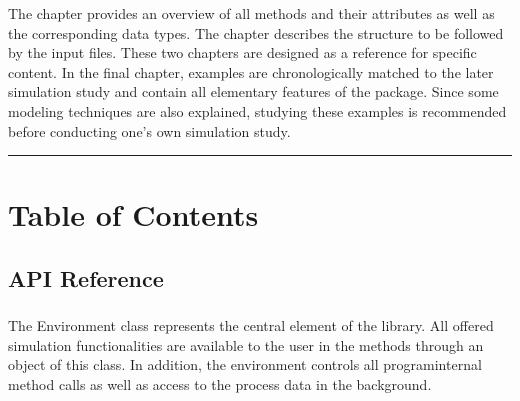 \documentclass[letterpaper,10pt,english]{sphinxmanual}
\begin{document}
\sphinxAtStartPar
The {\hyperref[\detokenize{source/API/api:api}]{}} chapter provides an overview of all methods and their attributes as well as the
corresponding data types. The  {\hyperref[\detokenize{source/Interface_files/interface:interface}]{}} chapter describes the structure to be followed by the
input files. These two chapters are designed as a reference for specific content. In the final
{\hyperref[\detokenize{source/Examples/examples:examples}]{}} chapter, examples are chronologically matched to the later simulation study and contain all
elementary features of the package. Since some modeling techniques are also explained, studying these examples is
recommended before conducting one’s own simulation study.


\bigskip\hrule\bigskip



\chapter{Table of Contents}
\label{\detokenize{index:table-of-contents}}

\section{API Reference}
\label{\detokenize{source/API/api:api-reference}}\label{\detokenize{source/API/api:api}}\label{\detokenize{source/API/api::doc}}

\subsection{}
\label{\detokenize{source/API/api:environment}}
\sphinxAtStartPar
The Environment class represents the central element of the library. All offered simulation functionalities are
available to the user in the methods through an object of this class. In addition, the environment controls all
program\sphinxhyphen{}internal method calls as well as access to the process data in the background.

\label{\detokenize{source/API/api:module-environment}}
\end{document}
